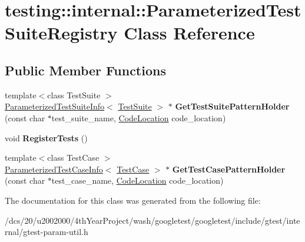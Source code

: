 \hypertarget{classtesting_1_1internal_1_1ParameterizedTestSuiteRegistry}{}\section{testing\+:\+:internal\+:\+:Parameterized\+Test\+Suite\+Registry Class Reference}
\label{classtesting_1_1internal_1_1ParameterizedTestSuiteRegistry}
\subsection*{Public Member Functions}
\begin{DoxyCompactItemize}
\item 
\mbox{\label{classtesting_1_1internal_1_1ParameterizedTestSuiteRegistry_a89ef6dd228f4188e1928513e860580d0}} 
{\footnotesize template$<$class Test\+Suite $>$ }\\\mbox{\hyperlink{classtesting_1_1internal_1_1ParameterizedTestSuiteInfo}{Parameterized\+Test\+Suite\+Info}}$<$ \mbox{\hyperlink{classtesting_1_1TestSuite}{Test\+Suite}} $>$ $\ast$ {\bfseries Get\+Test\+Suite\+Pattern\+Holder} (const char $\ast$test\+\_\+suite\+\_\+name, \mbox{\hyperlink{structtesting_1_1internal_1_1CodeLocation}{Code\+Location}} code\+\_\+location)
\item 
\mbox{\label{classtesting_1_1internal_1_1ParameterizedTestSuiteRegistry_a44c2ee0296de42dc6ca7abbf48d00495}} 
void {\bfseries Register\+Tests} ()
\item 
\mbox{\label{classtesting_1_1internal_1_1ParameterizedTestSuiteRegistry_a3fe06fb4e1b4194dae1fbcdf3560fbd3}} 
{\footnotesize template$<$class Test\+Case $>$ }\\\mbox{\hyperlink{classtesting_1_1internal_1_1ParameterizedTestSuiteInfo}{Parameterized\+Test\+Case\+Info}}$<$ \mbox{\hyperlink{classtesting_1_1TestSuite}{Test\+Case}} $>$ $\ast$ {\bfseries Get\+Test\+Case\+Pattern\+Holder} (const char $\ast$test\+\_\+case\+\_\+name, \mbox{\hyperlink{structtesting_1_1internal_1_1CodeLocation}{Code\+Location}} code\+\_\+location)
\end{DoxyCompactItemize}


The documentation for this class was generated from the following file\+:\begin{DoxyCompactItemize}
\item 
/dcs/20/u2002000/4th\+Year\+Project/wash/googletest/googletest/include/gtest/internal/gtest-\/param-\/util.\+h\end{DoxyCompactItemize}
